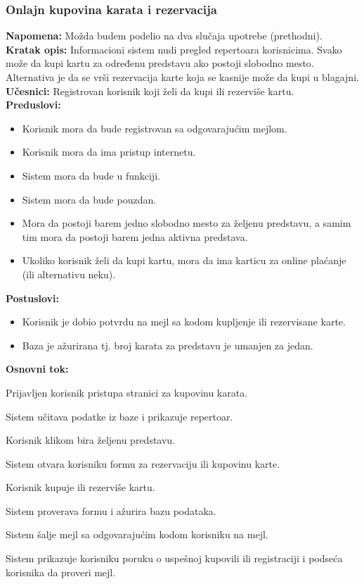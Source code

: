 \documentclass[a4paper]{article}
\begin{document}
\subsubsection{Onlajn kupovina karata i rezervacija}

\textbf{Napomena:} Možda budem podelio na dva slučaja upotrebe (prethodni).\\

\noindent\textbf{Kratak opis:} Informacioni sistem nudi pregled repertoara korisnicima. 
        Svako može da kupi kartu za određenu predstavu ako postoji slobodno mesto.
        Alternativa je da se vrši rezervacija karte koja se kasnije može da kupi u blagajni.\\

\noindent\textbf{Učesnici:} Registrovan korisnik koji želi da kupi ili rezerviše kartu.\\

\noindent\textbf{Preduslovi:} 
  \begin{itemize}
    \item Korisnik mora da bude registrovan sa odgovarajućim mejlom. 
    \item Korisnik mora da ima pristup internetu.
    \item Sistem mora da bude u funkciji.
    \item Sistem mora da bude pouzdan. 
    \item Mora da postoji barem jedno slobodno mesto za željenu predstavu, a samim tim mora da 
          postoji barem jedna aktivna predstava. 
    \item Ukoliko korisnik želi da kupi kartu, mora da ima karticu za online plaćanje (ili 
          alternativu neku).
  \end{itemize}
  
\noindent\textbf{Postuslovi:} 
  \begin{itemize}
    \item Korisnik je dobio potvrdu na mejl sa kodom kupljenje ili rezervisane karte.
    \item Baza je ažurirana tj. broj karata za predstavu je umanjen za jedan.
  \end{itemize}

\noindent\textbf{Osnovni tok:}
  \begin{legal}
    \item Prijavljen korisnik pristupa stranici za kupovinu karata. 
    \item Sistem učitava podatke iz baze i prikazuje repertoar.
    \item Korisnik klikom bira željenu predstavu.
    \item Sistem otvara korisniku formu za rezervaciju ili kupovinu karte.
    \item Korisnik kupuje ili rezerviše kartu.
    \item Sistem proverava formu i ažurira bazu podataka.
    \item Sistem šalje mejl sa odgovarajućim kodom korisniku na mejl.
    \item Sistem prikazuje korisniku poruku o uspešnoj kupovili ili registraciji i podseća
          korisnika da proveri mejl.
  \end{legal}
\end{document}
